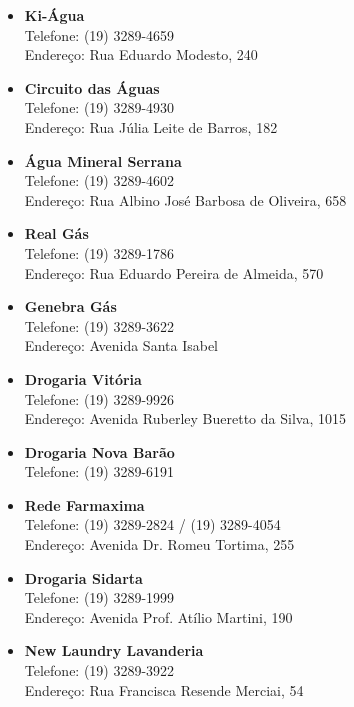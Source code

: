 \begin{itemize}
\item  \textbf{Ki-Água}
		\\Telefone: (19) 3289-4659
		\\Endereço: Rua Eduardo Modesto, 240

\item  \textbf{Circuito das Águas}
		\\Telefone: (19) 3289-4930
		\\Endereço: Rua Júlia Leite de Barros, 182

\item  \textbf{Água Mineral Serrana}
		\\Telefone: (19) 3289-4602
		\\Endereço: Rua Albino José Barbosa de Oliveira, 658

\item  \textbf{Real Gás}
		\\Telefone: (19) 3289-1786
		\\Endereço: Rua Eduardo Pereira de Almeida, 570

\item  \textbf{Genebra Gás}
		\\Telefone: (19) 3289-3622
		\\Endereço: Avenida Santa Isabel

\item  \textbf{Drogaria Vitória}
		\\Telefone: (19) 3289-9926
		\\Endereço: Avenida Ruberley Bueretto da Silva, 1015

\item  \textbf{Drogaria Nova Barão}
		\\Telefone: (19) 3289-6191

\item  \textbf{Rede Farmaxima}
		\\Telefone: (19) 3289-2824 / (19) 3289-4054
		\\Endereço: Avenida Dr. Romeu Tortima, 255

\item  \textbf{Drogaria Sidarta}
		\\Telefone: (19) 3289-1999
		\\Endereço: Avenida Prof. Atílio Martini, 190

\item  \textbf{New Laundry Lavanderia}
		\\Telefone: (19) 3289-3922
		\\Endereço: Rua Francisca Resende Merciai, 54


\end{itemize}
